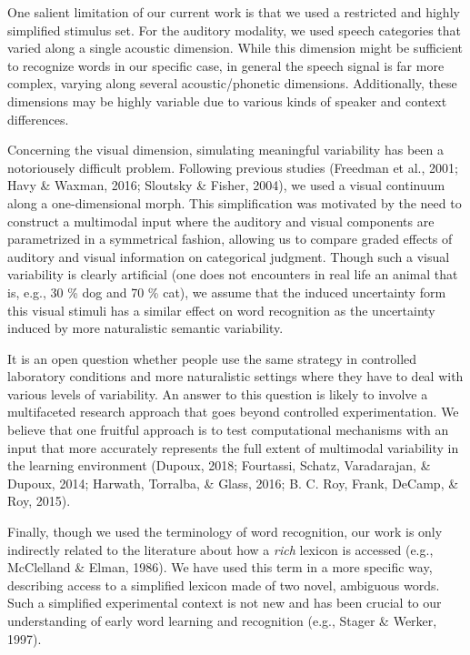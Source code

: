 \documentclass[english,,man,floatsintext]{apa6}
\theoremstyle{definition}
\theoremstyle{definition}
\theoremstyle{definition}
\theoremstyle{remark}
\begin{document}
One salient limitation of our current work is that we used a restricted
and highly simplified stimulus set. For the auditory modality, we used
speech categories that varied along a single acoustic dimension. While
this dimension might be sufficient to recognize words in our specific
case, in general the speech signal is far more complex, varying along
several acoustic/phonetic dimensions. Additionally, these dimensions may
be highly variable due to various kinds of speaker and context
differences.

Concerning the visual dimension, simulating meaningful variability has
been a notoriousely difficult problem. Following previous studies
(Freedman et al., 2001; Havy \& Waxman, 2016; Sloutsky \& Fisher, 2004),
we used a visual continuum along a one-dimensional morph. This
simplification was motivated by the need to construct a multimodal input
where the auditory and visual components are parametrized in a
symmetrical fashion, allowing us to compare graded effects of auditory
and visual information on categorical judgment. Though such a visual
variability is clearly artificial (one does not encounters in real life
an animal that is, e.g., 30 \% dog and 70 \% cat), we assume that the
induced uncertainty form this visual stimuli has a similar effect on
word recognition as the uncertainty induced by more naturalistic
semantic variability.

It is an open question whether people use the same strategy in
controlled laboratory conditions and more naturalistic settings where
they have to deal with various levels of variability. An answer to this
question is likely to involve a multifaceted research approach that goes
beyond controlled experimentation. We believe that one fruitful approach
is to test computational mechanisms with an input that more accurately
represents the full extent of multimodal variability in the learning
environment (Dupoux, 2018; Fourtassi, Schatz, Varadarajan, \& Dupoux,
2014; Harwath, Torralba, \& Glass, 2016; B. C. Roy, Frank, DeCamp, \&
Roy, 2015).

Finally, though we used the terminology of word recognition, our work is
only indirectly related to the literature about how a \emph{rich}
lexicon is accessed (e.g., McClelland \& Elman, 1986). We have used this
term in a more specific way, describing access to a simplified lexicon
made of two novel, ambiguous words. Such a simplified experimental
context is not new and has been crucial to our understanding of early
word learning and recognition (e.g., Stager \& Werker, 1997).
\end{document}
